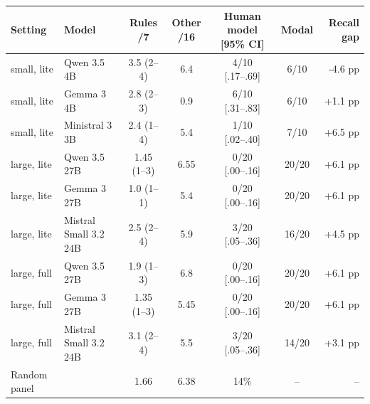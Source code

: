 \begin{tabular}{@{}llccccr@{}}
\toprule
Setting & Model & Rules /7 & Other /16 & Human model [95\% CI] & Modal & Recall gap \\
\midrule
small, lite & Qwen 3.5 4B & 3.5 (2--4) & 6.4 & 4/10 [.17--.69] & 6/10 & -4.6 pp \\
small, lite & Gemma 3 4B & 2.8 (2--3) & 0.9 & 6/10 [.31--.83] & 6/10 & +1.1 pp \\
small, lite & Ministral 3 3B & 2.4 (1--4) & 5.4 & 1/10 [.02--.40] & 7/10 & +6.5 pp \\
\midrule
large, lite & Qwen 3.5 27B & 1.45 (1--3) & 6.55 & 0/20 [.00--.16] & 20/20 & +6.1 pp \\
large, lite & Gemma 3 27B & 1.0 (1--1) & 5.4 & 0/20 [.00--.16] & 20/20 & +6.1 pp \\
large, lite & Mistral Small 3.2 24B & 2.5 (2--4) & 5.9 & 3/20 [.05--.36] & 16/20 & +4.5 pp \\
\midrule
large, full & Qwen 3.5 27B & 1.9 (1--3) & 6.8 & 0/20 [.00--.16] & 20/20 & +6.1 pp \\
large, full & Gemma 3 27B & 1.35 (1--3) & 5.45 & 0/20 [.00--.16] & 20/20 & +6.1 pp \\
large, full & Mistral Small 3.2 24B & 3.1 (2--4) & 5.5 & 3/20 [.05--.36] & 14/20 & +3.1 pp \\
\midrule
Random panel & & 1.66 & 6.38 & 14\% & -- & -- \\
\bottomrule
\end{tabular}
